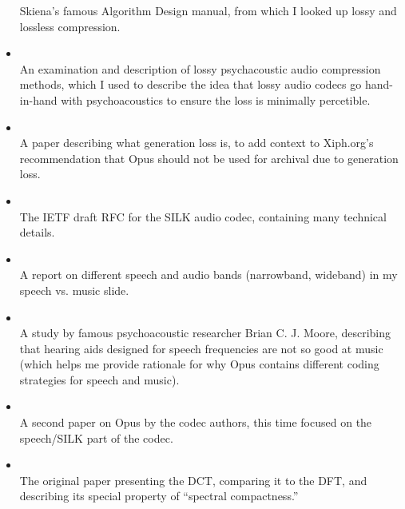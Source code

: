 \documentclass[letter,12pt]{report}
\begin{document}
\begin{itemize}
		Skiena's famous Algorithm Design manual, from which I looked up lossy and lossless compression.
	\item
		\\
		An examination and description of lossy psychacoustic audio compression methods, which I used to describe the idea that lossy audio codecs go hand-in-hand with psychoacoustics to ensure the loss is minimally percetible.
	\item
		\\
		A paper describing what generation loss is, to add context to Xiph.org's recommendation that Opus should not be used for archival due to generation loss.
	\item
		\\
		The IETF draft RFC for the SILK audio codec, containing  many technical details.
	\item
		\\
		A report on different speech and audio bands (narrowband, wideband) in my speech vs. music slide.
	\item
		\\
		A study by famous psychoacoustic researcher Brian C. J. Moore, describing that hearing aids designed for speech frequencies are not so good at music (which helps me provide rationale for why Opus contains different coding strategies for speech and music).
	\item
		\\
		A second paper on Opus by the codec authors, this time focused on the speech/SILK part of the codec.
	\item
		\\
		The original paper presenting the DCT, comparing it to the DFT, and describing its special property of ``spectral compactness.''
\end{itemize}
\end{document}
